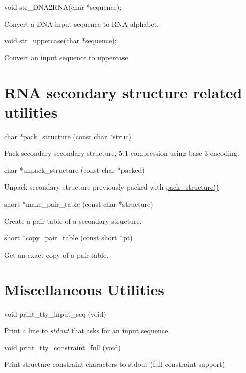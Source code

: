 \begin{DoxyVerb}void str_DNA2RNA(char *sequence);
\end{DoxyVerb}
 Convert a D\+N\+A input sequence to R\+N\+A alphabet.

\begin{DoxyVerb}void str_uppercase(char *sequence);
\end{DoxyVerb}
 Convert an input sequence to uppercase.

\hypertarget{mp_utils_utils_struc}{}\section{R\+N\+A secondary structure related utilities}\label{mp_utils_utils_struc}
\begin{DoxyVerb}char *pack_structure (const char *struc)
\end{DoxyVerb}
 Pack secondary secondary structure, 5\+:1 compression using base 3 encoding.

\begin{DoxyVerb}char *unpack_structure (const char *packed)
\end{DoxyVerb}
 Unpack secondary structure previously packed with \hyperlink{group__struct__utils_gac6dfa5e22928c087c6e09ff0054a7ced}{pack\+\_\+structure()}

\begin{DoxyVerb}short *make_pair_table (const char *structure)
\end{DoxyVerb}
 Create a pair table of a secondary structure.

\begin{DoxyVerb}short *copy_pair_table (const short *pt)
\end{DoxyVerb}
 Get an exact copy of a pair table.

\hypertarget{mp_utils_utils_misc}{}\section{Miscellaneous Utilities}\label{mp_utils_utils_misc}
\begin{DoxyVerb}void print_tty_input_seq (void)
\end{DoxyVerb}
 Print a line to {\itshape stdout} that asks for an input sequence.

\begin{DoxyVerb}void print_tty_constraint_full (void)
\end{DoxyVerb}
 Print structure constraint characters to stdout (full constraint support)

